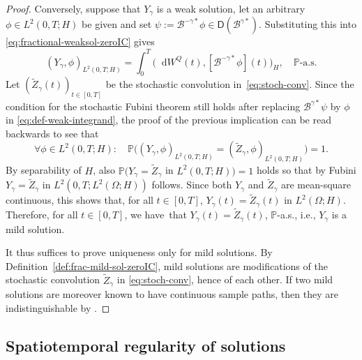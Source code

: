 \documentclass[reqno]{amsart}
\numberwithin{equation}{section}
\newcommand{\bbP}{\mathbb{P}}
\newcommand{\cB}{\mathcal{B}}
\newcommand{\rd}{\mathop{}\!\mathrm{d}}
\theoremstyle{remark}
\theoremstyle{definition}
\begin{document}
\begin{proof}
	Conversely, suppose that $Y_\gamma$ is a weak solution, 
	let an arbitrary $\phi \in L^2(0,T;H)$ be given and 
	set $\psi := \cB^{-\gamma*} \phi \in \mathsf D(\cB^{\gamma*})$. 
	Substituting this into \eqref{eq:fractional-weaksol-zeroIC} 
	gives 
	\[ 
	( Y_\gamma, \phi )_{L^2(0,T;H)} 
	=  
	\int_0^T 
	\bigl( \rd W^Q(t), [\cB^{-\gamma*} \phi](t) \bigr)_H, 
	\quad 
	\bbP\text{-a.s.} 
	\] 
	Let $(\widetilde{Z}_\gamma(t))_{t\in[0,T]}$ be the stochastic convolution 
	in~\eqref{eq:stoch-conv}. 
	Since the condition for the stochastic Fubini theorem 
	still holds after replacing $\cB^{\gamma*}\psi$ 
	by $\phi$ in \eqref{eq:def-weak-integrand}, 
	the proof of the previous implication 
	can be read backwards to see that
	\[ 
	\forall 
	\phi \in L^2(0,T;H): 
	\quad 
	\bbP\bigl( 
	( Y_\gamma, \phi )_{L^2(0,T;H)} 
	= 
	( \widetilde{Z}_\gamma, \phi)_{L^2(0,T;H)} 
	\bigr) 
	=1. 
	\] 
	By separability of $H$, 
	also $\bbP( Y_\gamma = \widetilde{Z}_\gamma$ in $L^2(0,T;H) ) = 1$ 
	holds so that 
	by Fubini 
	$Y_\gamma = \widetilde{Z}_\gamma$ in $L^2(0,T;L^2(\Omega;H))$ 
	follows. 
	Since both $Y_\gamma$ and $\widetilde{Z}_\gamma$ 
	are mean-square continuous, this shows that, 
	for all $t\in[0,T]$, 
	$Y_\gamma(t) = \widetilde{Z}_\gamma(t)$ in $L^2(\Omega;H)$. 
	Therefore, for all $t\in[0,T]$, we have~that 
	$Y_\gamma(t) = \widetilde{Z}_\gamma(t)$, $\bbP$-a.s., 
	i.e., $Y_\gamma$ is a mild solution.  
	
	It thus suffices to prove uniqueness 
	only for mild solutions. 
	By Definition~\ref{def:frac-mild-sol-zeroIC},
	mild solutions are modifications of the stochastic convolution
	$\widetilde Z_\gamma$ in \eqref{eq:stoch-conv},
	hence of each other. If two mild solutions are
	moreover known to have continuous sample paths, then they are indistinguishable by
	\cite[Proposition~3.17]{Peszat_zabczyk_2007}. 
\end{proof}

\subsection{Spatiotemporal regularity of solutions}
\label{subsec:analysis-zeroIC:existence-uniqueness-regularity} 
\end{document}

